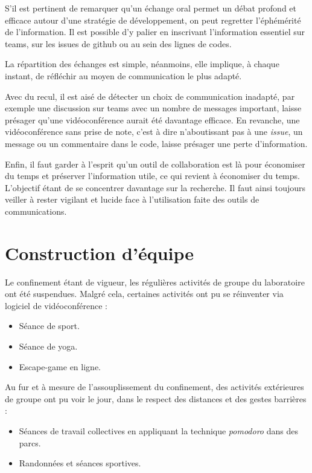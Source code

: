 S'il est pertinent de remarquer qu'un échange oral permet un débat profond et efficace autour d'une stratégie de développement, on peut regretter l'éphémérité de l'information. Il est possible d'y palier en inscrivant l'information essentiel sur teams, sur les issues de github ou au sein des lignes de codes.

La répartition des échanges est simple, néanmoins, elle implique, à chaque instant, de réfléchir au moyen de communication le plus adapté.

Avec du recul, il est aisé de détecter un choix de communication inadapté, par exemple une discussion sur teams avec un nombre de messages important, laisse présager qu'une vidéoconférence aurait été davantage efficace. En revanche, une vidéoconférence sans prise de note, c'est à dire n'aboutissant pas à une \emph{issue}, un message ou un commentaire dans le code, laisse présager une perte d'information.

Enfin, il faut garder à l'esprit qu'un outil de collaboration est là pour économiser du temps et préserver l'information utile, ce qui revient à économiser du temps. L'objectif étant de se concentrer davantage sur la recherche. Il faut ainsi toujours veiller à rester vigilant et lucide face à l'utilisation faite des outils de communications.


        \section{Construction d'équipe}
        
Le confinement étant de vigueur, les régulières activités de groupe du laboratoire ont été suspendues. Malgré cela, certaines activités ont pu se réinventer via logiciel de vidéoconférence :
\begin{itemize}
\setlength\itemsep{-0.5em}
\item Séance de sport.
\item Séance de yoga.
\item Escape-game en ligne.
\end{itemize}

Au fur et à mesure de l'assouplissement du confinement, des activités extérieures de groupe ont pu voir le jour, dans le respect des distances et des gestes barrières :
\begin{itemize}
\setlength\itemsep{-0.5em}
\item Séances de travail collectives en appliquant la technique \emph{\gls{pomodoro}} dans des parcs.
\item Randonnées et séances sportives.
\end{itemize}


